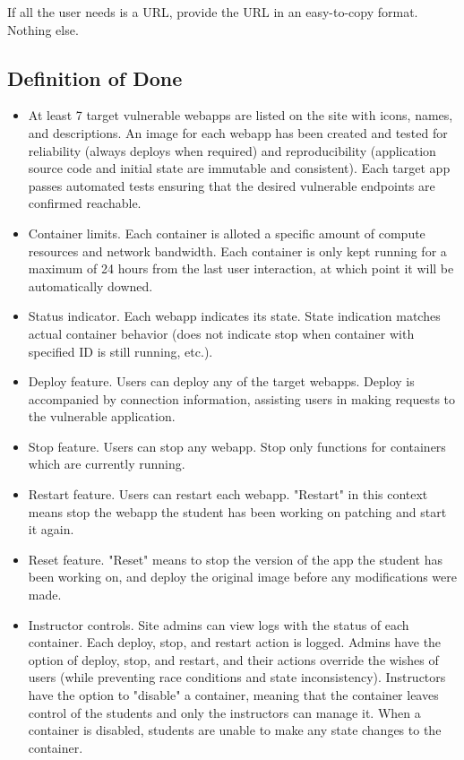 \documentclass[12pt]{article}
\begin{document}
If all the user needs is a URL, provide the URL in an easy-to-copy format. Nothing else.

\subsection{Definition of Done}
\begin{itemize}
	\item At least 7 target vulnerable webapps are listed on the site with icons, names, and descriptions. An image for each webapp has been created and tested for reliability (always deploys when required) and reproducibility (application source code and initial state are immutable and consistent). Each target app passes automated tests ensuring that the desired vulnerable endpoints are confirmed reachable.
	\item Container limits. Each container is alloted a specific amount of compute resources and network bandwidth. Each container is only kept running for a maximum of 24 hours from the last user interaction, at which point it will be automatically downed.
	\item Status indicator. Each webapp indicates its state. State indication matches actual container behavior (does not indicate stop when container with specified ID is still running, etc.).
	\item Deploy feature. Users can deploy any of the target webapps. Deploy is accompanied by connection information, assisting users in making requests to the vulnerable application.
	\item Stop feature. Users can stop any webapp. Stop only functions for containers which are currently running.
	\item Restart feature. Users can restart each webapp. "Restart" in this context means stop the webapp the student has been working on patching and start it again.
	\item Reset feature. "Reset" means to stop the version of the app the student has been working on, and deploy the original image before any modifications were made.
	\item Instructor controls. Site admins can view logs with the status of each container. Each deploy, stop, and restart action is logged. Admins have the option of deploy, stop, and restart, and their actions override the wishes of users (while preventing race conditions and state inconsistency). Instructors have the option to "disable" a container, meaning that the container leaves control of the students and only the instructors can manage it. When a container is disabled, students are unable to make any state changes to the container.

\end{itemize}
\end{document}
